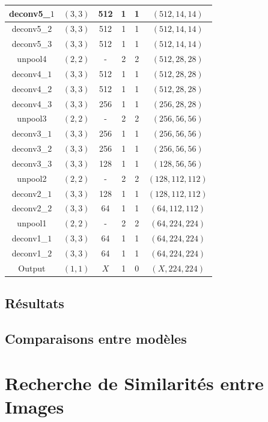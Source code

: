 \documentclass[a4paper, 11pt]{report}
\begin{document}
\begin{center}
\begin{tabular}{|c|c|c|c|c|c|}
	\hline
	deconv5\_$1$ & $(3, 3)$ & 512 & 1 & 1 & $(512, 14, 14)$ \\
	\hline
	deconv5\_$2$ & $(3, 3)$ & 512 & 1 & 1 & $(512, 14, 14)$ \\
	\hline
	deconv5\_$3$ & $(3, 3)$ & 512 & 1 & 1 & $(512, 14, 14)$ \\
	\hline
	unpool4 & $(2, 2)$ & - & 2 & 2 & $(512, 28, 28)$ \\
	\hline
	deconv4\_$1$ & $(3, 3)$ & 512 & 1 & 1 & $(512, 28, 28)$ \\
	\hline
	deconv4\_$2$ & $(3, 3)$ & 512 & 1 & 1 & $(512, 28, 28)$ \\
	\hline
	deconv4\_$3$ & $(3, 3)$ & 256 & 1 & 1 & $(256, 28, 28)$ \\
	\hline
	unpool3 & $(2, 2)$ & - & 2 & 2 & $(256, 56, 56)$ \\
	\hline
	deconv3\_$1$ & $(3, 3)$ & 256 & 1 & 1 & $(256, 56, 56)$ \\
	\hline
	deconv3\_$2$ & $(3, 3)$ & 256 & 1 & 1 & $(256, 56, 56)$ \\
	\hline
	deconv3\_$3$ & $(3, 3)$ & 128 & 1 & 1 & $(128, 56, 56)$ \\
	\hline
	unpool2 & $(2, 2)$ & - & 2 & 2 & $(128, 112, 112)$ \\
	\hline
	deconv2\_$1$ & $(3, 3)$ & 128 & 1 & 1 & $(128, 112, 112)$ \\
	\hline
	deconv2\_$2$ & $(3, 3)$ & 64 & 1 & 1 & $(64, 112, 112)$ \\
	\hline
	unpool1 & $(2, 2)$ & - & 2 & 2 & $(64, 224, 224)$ \\
	\hline
	deconv1\_$1$ & $(3, 3)$ & 64 & 1 & 1 & $(64, 224, 224)$ \\
	\hline
	deconv1\_$2$ & $(3, 3)$ & 64 & 1 & 1 & $(64, 224, 224)$ \\
	\hline
	Output & $(1, 1)$ & $X$ & 1 & 0 & $(X, 224, 224)$ \\
	\hline
	\end{tabular} 
\end{center}
\subsection{Résultats}
\subsection{Comparaisons entre modèles}
\section{Recherche de Similarités entre Images}
\end{document}
